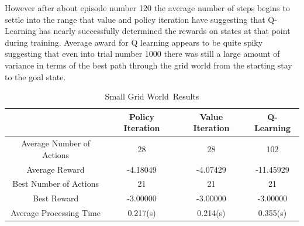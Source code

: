 \documentclass[11pt]{article}
\newcommand{\problemone}{Small Grid World}
\begin{document}
    However after about episode number 120 the average number of steps begins to settle into the range that value and
    policy iteration have suggesting that Q-Learning has nearly successfully determined the rewards on states at that point
    during training.
    Average award for Q learning appears to be quite spiky suggesting that even into trial number 1000 there was still
    a large amount of variance in terms of the best path through the grid world from the starting stay to the goal state.
    \begin{table}
        \centering
        \begin{tabular}{|c| c | c | c |}
            \hline
            & Policy Iteration & Value Iteration & Q-Learning \\
            \hline
            \hline
            Average Number of Actions & 28               & 28              & 102        \\
            \hline
            Average Reward            & -4.18049         & -4.07429        & -11.45929  \\
            \hline
            Best Number of Actions    & 21               & 21              & 21         \\
            \hline
            Best Reward               & -3.00000         & -3.00000        & -3.00000   \\
            \hline
            Average Processing Time   & 0.217(s)         & 0.214(s)        & 0.355(s)   \\
            \hline
        \end{tabular}
        \caption{\label{tab:\problemone~Results}\problemone~Results}
    \end{table}
\end{document}
